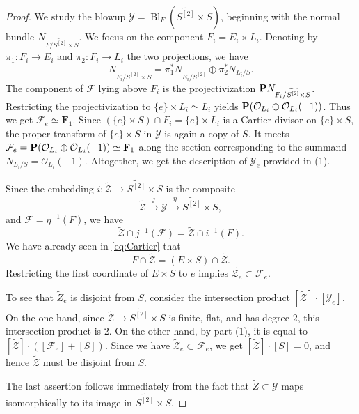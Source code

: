 \documentclass[reqno]{amsart}
\DeclareMathOperator{\Bl}{Bl}
\renewcommand{\to}{{\longrightarrow}}
\renewcommand {\P}{{\bf P}}
\numberwithin{equation}{section}
\renewcommand{\O}{\mathcal{O}}
\newcommand{\F}{\mathbf{F}}
\newcommand{\td}{\widetilde}
\begin{document}
\begin{proof}
  We study the blowup $\mathcal{Y} = \Bl_{F} \left( \td{S^{[2]}} \times S
  \right)$, beginning with the normal bundle $N_{F/ \td{S^{[2]}} \times S }$.
  We focus on the component $F_{i} = E_{i} \times L_{i}$.
  Denoting by ${\pi}_1 \colon F_i \to E_i$ and ${\pi}_2 \colon F_i \to L_i$ the two projections, we have
  \[N_{F_{i}/ \td{S^{[2]}} \times S } = {\pi}_{1}^{*}
    N_{E_{i}/\td{S^{[2]}}} \oplus {\pi}_{2}^{*}N_{L_{i}/S}.\]
  The component of $\mathcal{F}$ lying above $F_{i}$ is the
  projectivization $\P N_{F_{i}/ \td{S^{[2]}} \times S }$.
  Restricting the projectivization to $\{e\} \times L_{i} \simeq L_i$ yields
  $\P (\O_{L_{i}} \oplus \O_{L_{i}}(-1))$.
  Thus we get  $\mathcal{F}_{e} \simeq \F_{1}$.
  Since $(\{e\} \times S) \cap F_{i} = \{e\} \times L_{i}$ is a Cartier
  divisor on $\{e\} \times S$, the proper transform of $\{e\} \times S$ in
  $\mathcal{Y}$ is again a copy of $S$.
  It meets
  $\mathcal{F}_{e} = \P (\O_{L_{i}} \oplus \O_{L_{i}}(-1)) \simeq
  \F_{1}$ along the section corresponding to the summand
  $N_{L_{i}/S} = \O_{L_{i}}(-1)$.
  Altogether, we get the description of $\mathcal{Y}_{e}$ provided in (1).

  Since the embedding $i \colon \widetilde {\mathcal{Z}} \to \widetilde{S^{[2]}} \times S$ is the composite
  \[\widetilde {\mathcal{Z}} \xrightarrow{j} \mathcal{Y} \xrightarrow{\eta} \widetilde{S^{[2]}} \times S,\]
  and $\mathcal{F} = \eta^{-1}(F)$, we have
  \[ \widetilde {\mathcal{Z}} \cap j^{-1}\left(\mathcal{F}\right) = \widetilde {\mathcal{Z}} \cap i^{-1}(F).\]
  We have already seen in \eqref{eq:Cartier} that
  \[F \cap \td{\mathcal{Z}} = (E \times S)\cap \td{\mathcal{Z}}.\]
  Restricting the first coordinate of $E \times S$ to $e$ implies
  $\td{\mathcal{Z}_{e}} \subset \mathcal{F}_{e}$.

  To see that $\widetilde Z_e$ is disjoint from $S$, consider
the intersection product
$[\td{\mathcal{Z}}] \cdot [\mathcal{Y}_{e}]$.  On the one hand, since
$\td{\mathcal{Z}} \to \td{S^{[2]}} \times S$ is finite,
flat, and has degree $2$, this intersection product is $2$.  On the
other hand, by part (1), it is equal to
$[\td{\mathcal{Z}}] \cdot ([\mathcal{F}_{e}]+ [S])$.
Since we have
$\td{\mathcal{Z}}_{e} \subset \mathcal{F}_{e}$, we get
$[\td{\mathcal{Z}}] \cdot [S] = 0$, and hence $\td{\mathcal{Z}}$ must be disjoint from $S$.

The last assertion follows immediately from the fact that $\widetilde Z \subset \mathcal{Y}$ maps isomorphically to its image in $\widetilde{S^{[2]}} \times S$.
\end{proof}
\end{document}
